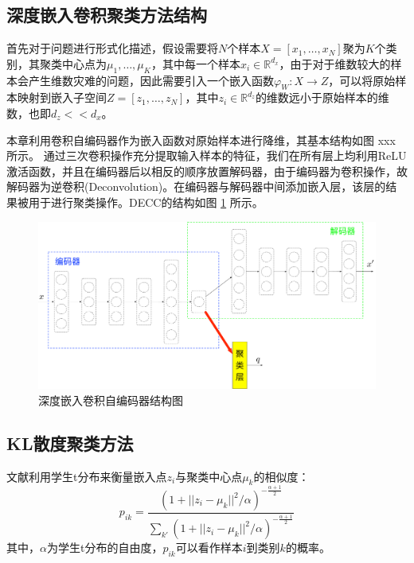 \subsection{深度嵌入卷积聚类方法结构}
首先对于问题进行形式化描述，假设需要将$N$个样本$X=[x_1,\dots,x_N]$聚为$K$个类别，其聚类中心点为$\mu_1,\dots,\mu_K$，其中每一个样本$x_i\in \mathbb{R}^{d_x}$，由于对于维数较大的样本会产生维数灾难的问题，因此需要引入一个嵌入函数$\varphi_W: X \rightarrow Z$，可以将原始样本映射到嵌入子空间$Z=[z_1,\dots,z_N]$，其中$z_i\in \mathbb{R}^{d_z}$的维数远小于原始样本的维数，也即$d_z<<d_x$。

本章利用卷积自编码器作为嵌入函数对原始样本进行降维，其基本结构如图 xxx 所示。
通过三次卷积操作充分提取输入样本的特征，我们在所有层上均利用ReLU激活函数，并且在编码器后以相反的顺序放置解码器，由于编码器为卷积操作，故解码器为逆卷积(Deconvolution)。在编码器与解码器中间添加嵌入层，该层的结果被用于进行聚类操作。DECC的结构如图 \ref{fig:decc} 所示。

\begin{figure}
	\centering
	\includegraphics[width=\textwidth]{figures/AE/decc}
	\caption{深度嵌入卷积自编码器结构图}
	\label{fig:decc}
\end{figure}

\subsection{KL散度聚类方法}

文献\cite{maaten2008visualizing}利用学生t分布来衡量嵌入点$z_i$与聚类中心点$\mu_k$的相似度：
\begin{equation}
	p_{ik}=\frac{(1+||z_i-\mu_k||^2/\alpha)^{-\frac{\alpha+1}{2}}}{\sum_{k'}(1+||z_i-\mu_k||^2/\alpha)^{-\frac{\alpha+1}{2}}}
\end{equation}
其中，$\alpha$为学生t分布的自由度，$p_{ik}$可以看作样本$i$到类别$k$的概率。

